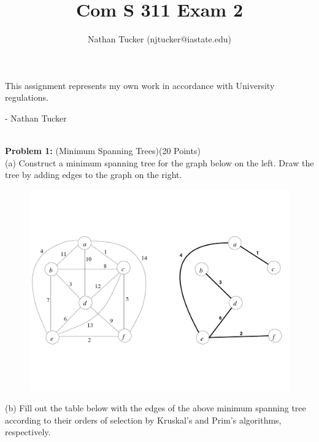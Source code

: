 \documentclass[11pt]{amsart}
\begin{document}
\title{Com S 311 Exam 2}
\author{Nathan Tucker (njtucker@iastate.edu)}
\maketitle

\doublespacing

\vspace{10mm}

\vfill
\begin{flushright}
This assignment represents my own work in accordance with University regulations.

- Nathan Tucker
\end{flushright}
\newpage
\vspace{-.8cm}

\newpage
\hrulefill \\

\textbf{Problem 1:} (Minimum Spanning Trees)\hfill (20 Points)\\

(a) Construct a minimum spanning tree for the graph below on the left. Draw the tree by adding edges to the graph on the right.

\begin{figure}[htb]
\begin{center}
\includegraphics[width=\textwidth]{MSTf.pdf}
\end{center}
\end{figure}

(b) Fill out the table below with the edges of the above minimum spanning tree according to their orders of selection by Kruskal's 
and Prim's algorithms, respectively.
\end{document}
